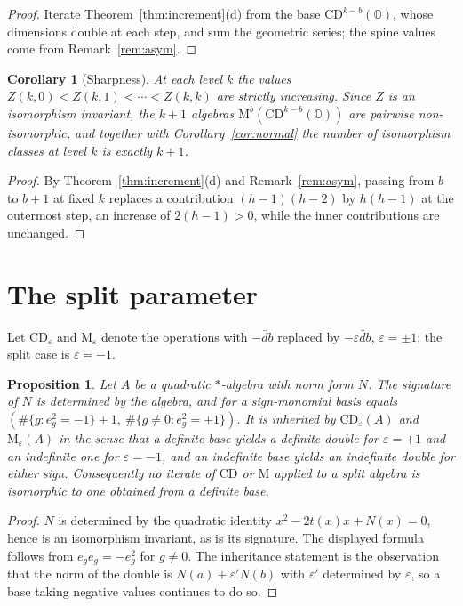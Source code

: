 \documentclass[11pt]{amsart}
\theoremstyle{plain}
\newtheorem{proposition}[theorem]{Proposition}
\newtheorem{corollary}[theorem]{Corollary}
\theoremstyle{definition}
\newcommand{\CD}{\mathrm{CD}}
\newcommand{\MM}{\mathrm{M}}
\newcommand{\OO}{\mathbb{O}}
\begin{document}
\begin{proof}
Iterate Theorem~\ref{thm:increment}(d) from the base $\CD^{k-b}(\OO)$, whose
dimensions double at each step, and sum the geometric series; the spine values
come from Remark~\ref{rem:asym}.
\end{proof}

\begin{corollary}[Sharpness]\label{cor:sharp}
At each level $k$ the values $Z(k,0)<Z(k,1)<\cdots<Z(k,k)$ are strictly
increasing. Since $Z$ is an isomorphism invariant, the $k+1$ algebras
$\MM^{b}(\CD^{k-b}(\OO))$ are pairwise non-isomorphic, and together with
Corollary~\ref{cor:normal} the number of isomorphism classes at level $k$ is
exactly $k+1$.
\end{corollary}

\begin{proof}
By Theorem~\ref{thm:increment}(d) and Remark~\ref{rem:asym}, passing from $b$ to
$b+1$ at fixed $k$ replaces a contribution $(h-1)(h-2)$ by $h(h-1)$ at the
outermost step, an increase of $2(h-1)>0$, while the inner contributions are
unchanged.
\end{proof}

\section{The split parameter}\label{sec:split}

Let $\CD_{\varepsilon}$ and $\MM_{\varepsilon}$ denote the operations with
$-\bar d b$ replaced by $-\varepsilon\bar d b$, $\varepsilon=\pm1$; the split
case is $\varepsilon=-1$.

\begin{proposition}\label{prop:split}
Let $A$ be a quadratic $*$-algebra with norm form $N$. The signature of $N$ is
determined by the algebra, and for a sign-monomial basis equals
$(\#\{g: e_g^{2}=-1\}+1,\ \#\{g\neq0: e_g^{2}=+1\})$. It is inherited by
$\CD_{\varepsilon}(A)$ and $\MM_{\varepsilon}(A)$ in the sense that a definite
base yields a definite double for $\varepsilon=+1$ and an indefinite one for
$\varepsilon=-1$, and an indefinite base yields an indefinite double for either
sign. Consequently no iterate of $\CD$ or $\MM$ applied to a split algebra is
isomorphic to one obtained from a definite base.
\end{proposition}

\begin{proof}
$N$ is determined by the quadratic identity $x^{2}-2t(x)x+N(x)=0$, hence is an
isomorphism invariant, as is its signature. The displayed formula follows from
$e_g\bar e_g=-e_g^{2}$ for $g\neq0$. The inheritance statement is the
observation that the norm of the double is $N(a)+\varepsilon' N(b)$ with
$\varepsilon'$ determined by $\varepsilon$, so a base taking negative values
continues to do so.
\end{proof}
\end{document}
